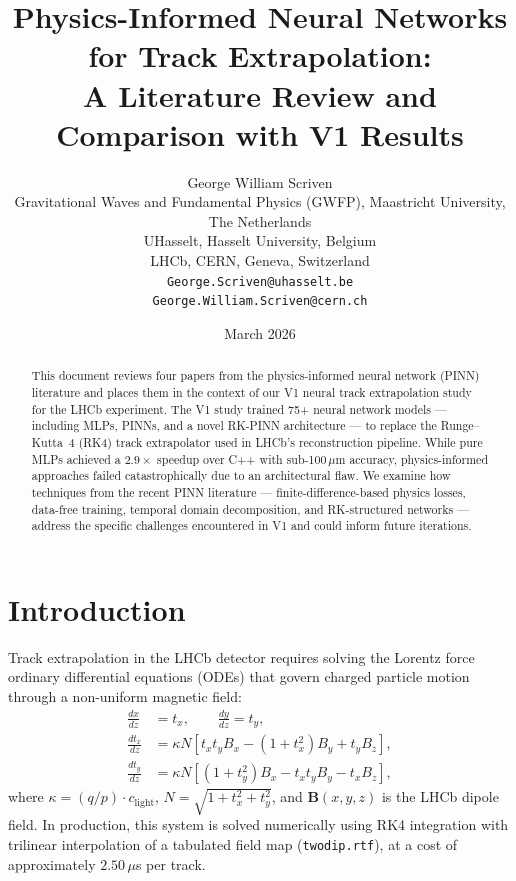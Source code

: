 \documentclass[12pt,a4paper]{article}
\title{\textbf{Physics-Informed Neural Networks for Track Extrapolation:\\
A Literature Review and Comparison with V1 Results}}
\author{George William Scriven \\[0.5em]
\small Gravitational Waves and Fundamental Physics (GWFP), Maastricht University, The Netherlands \\
\small UHasselt, Hasselt University, Belgium \\
\small LHCb, CERN, Geneva, Switzerland \\[0.5em]
\small \texttt{George.Scriven@uhasselt.be} \\
\small \texttt{George.William.Scriven@cern.ch}}
\date{March 2026}
\newcommand{\vb}[1]{\bm{#1}}
\begin{document}
\maketitle

\begin{abstract}
This document reviews four papers from the physics-informed neural network (PINN) literature and places them in the context of our V1 neural track extrapolation study for the LHCb experiment. The V1 study trained 75+ neural network models --- including MLPs, PINNs, and a novel RK-PINN architecture --- to replace the Runge--Kutta~4 (RK4) track extrapolator used in LHCb's reconstruction pipeline. While pure MLPs achieved a $2.9\times$ speedup over C++ with sub-100\,$\mu$m accuracy, physics-informed approaches failed catastrophically due to an architectural flaw. We examine how techniques from the recent PINN literature --- finite-difference-based physics losses, data-free training, temporal domain decomposition, and RK-structured networks --- address the specific challenges encountered in V1 and could inform future iterations.
\end{abstract}

\tableofcontents
\newpage

\section{Introduction}
\label{sec:introduction}

Track extrapolation in the LHCb detector requires solving the Lorentz force ordinary differential equations (ODEs) that govern charged particle motion through a non-uniform magnetic field:
\begin{align}
\frac{dx}{dz} &= t_x, \qquad \frac{dy}{dz} = t_y, \label{eq:eom_pos} \\
\frac{dt_x}{dz} &= \kappa N \left[ t_x t_y B_x - (1+t_x^2) B_y + t_y B_z \right], \label{eq:eom_tx} \\
\frac{dt_y}{dz} &= \kappa N \left[ (1+t_y^2) B_x - t_x t_y B_y - t_x B_z \right], \label{eq:eom_ty}
\end{align}
where $\kappa = (q/p) \cdot c_{\text{light}}$, $N = \sqrt{1 + t_x^2 + t_y^2}$, and $\vb{B}(x,y,z)$ is the LHCb dipole field. In production, this system is solved numerically using RK4 integration with trilinear interpolation of a tabulated field map (\texttt{twodip.rtf}), at a cost of approximately $2.50\,\mu$s per track.
\end{document}
